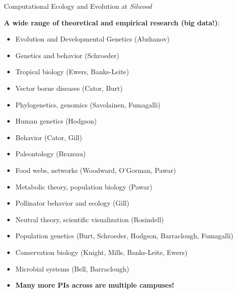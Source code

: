 \documentclass[xcolor={usenames,x11names},compress]{beamer}
\renewcommand{\(}{\begin{columns}}
\renewcommand{\)}{\end{columns}}
\newcommand{\<}[1]{\begin{column}{#1}}
\renewcommand{\>}{\end{column}}
\begin{document}
\begin{frame}{Computational Ecology and Evolution at {\it Silwood}}

{\bf A wide range of theoretical and empirical research (big data!)}:
\scriptsize
  \begin{itemize}\setlength{\itemindent}{0em}\itemsep2pt
		\item Evolution and Developmental Genetics (Abzhanov)
    \item Genetics and behavior (Schroeder)
    \item Tropical biology (Ewers, Banks-Leite)
    \item Vector borne diseases (Cator, Burt)
    \item Phylogenetics, genomics (Savolainen, Fumagalli)
    \item Human genetics (Hodgson)
    \item Behavior (Cator, Gill)
    \item Paleontology (Brazeau)
    \item Food webs, networks (Woodward, O'Gorman, Pawar)
    \item Metabolic theory, population biology (Pawar) 
    \item Pollinator behavior and ecology (Gill)
    \item Neutral theory, scientific visualization (Rosindell)
    \item Population genetics (Burt, Schroeder, Hodgson, Barraclough, Fumagalli)
    \item Conservation biology (Knight, Mills, Banks-Leite, Ewers)
    \item Microbial systems (Bell, Barraclough)
    \pause
    \item {\bf Many more PIs across are multiple campuses!}
  \end{itemize}  

\end{frame}
\end{document}
